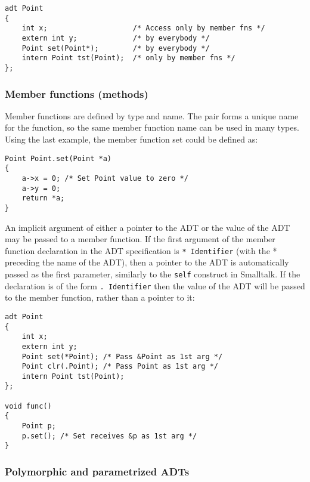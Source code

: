 \begin{lstlisting}
adt Point
{
    int x;                    /* Access only by member fns */
    extern int y;             /* by everybody */
    Point set(Point*);        /* by everybody */
    intern Point tst(Point);  /* only by member fns */
};
\end{lstlisting}

\hypertarget{member-functions-methods}{%
\subsubsection{Member functions
(methods)}\label{member-functions-methods}}

Member functions are defined by type and name. The pair forms a unique
name for the function, so the same member function name can be used in
many types. Using the last example, the member function set could be
defined as:

\begin{lstlisting}
Point Point.set(Point *a)
{
    a->x = 0; /* Set Point value to zero */
    a->y = 0;
    return *a;
}
\end{lstlisting}

An implicit argument of either a pointer to the ADT or the value of the
ADT may be passed to a member function. If the first argument of the
member function declaration in the ADT specification is
\passthrough{\lstinline!* Identifier!} (with the * preceding the name of
the ADT), then a pointer to the ADT is automatically passed as the first
parameter, similarly to the \passthrough{\lstinline!self!} construct in
Smalltalk. If the declaration is of the form
\passthrough{\lstinline!. Identifier!} then the value of the ADT will be
passed to the member function, rather than a pointer to it:

\begin{lstlisting}
adt Point
{
    int x;
    extern int y;
    Point set(*Point); /* Pass &Point as 1st arg */
    Point clr(.Point); /* Pass Point as 1st arg */
    intern Point tst(Point);
};

void func()
{
    Point p;
    p.set(); /* Set receives &p as 1st arg */
}
\end{lstlisting}

\hypertarget{polymorphic-and-parametrized-adts}{%
\subsubsection{Polymorphic and parametrized
ADTs}\label{polymorphic-and-parametrized-adts}}

